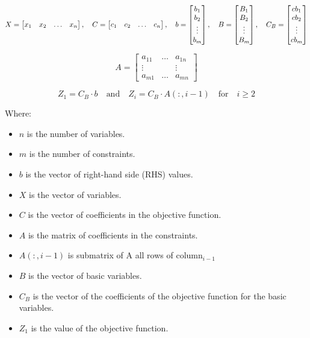 \[
X = \left[\begin{matrix} x_1 & x_2 & \dots & x_n \end{matrix}\right], \hspace{0.35cm}
C = \left[\begin{matrix} c_1 & c_2 & \dots & c_n \end{matrix}\right], \hspace{0.35cm}
b = \left[\begin{matrix} b_1 \\ b_2 \\ \vdots \\ b_m \end{matrix}\right], \hspace{0.35cm}
B = \left[\begin{matrix} B_1 \\ B_2 \\ \vdots \\ B_m \end{matrix}\right], \hspace{0.35cm}
C_B = \left[\begin{matrix} cb_1 \\ cb_2 \\ \vdots \\ cb_m \end{matrix}\right]
\]

\vspace{0.5cm}

\[
A = \left[\begin{matrix} a_{11} & \dots & a_{1n}\\
                           \vdots & & \vdots\\
                           a_{m1} & \dots & a_{mn}\end{matrix}\right]
\]


\vspace{0.75cm}
\[
Z_1 = C_B \cdot b \quad \text{and} \quad Z_i = C_B \cdot A(:, i-1) \quad \text{for} \quad i \geq 2 
\]

\vspace{0.5cm}
Where:
\begin{itemize}
    \item \( n \) is the number of variables.
    \item \( m \) is the number of constraints.
    \item \( b \) is the vector of right-hand side (RHS) values.
    \item \( X \) is the vector of variables.
    \item \( C \) is the vector of coefficients in the objective function.
    \item \( A \) is the matrix of coefficients in the constraints.
    \item \( A(:,i-1) \) is submatrix of A all rows of column\(_{i-1}\)
    \item \( B \) is the vector of basic variables.
    \item \( C_B \) is the vector of the coefficients of the objective function for the basic variables.
    \item \( Z_1 \) is the value of the objective function.
\end{itemize}

